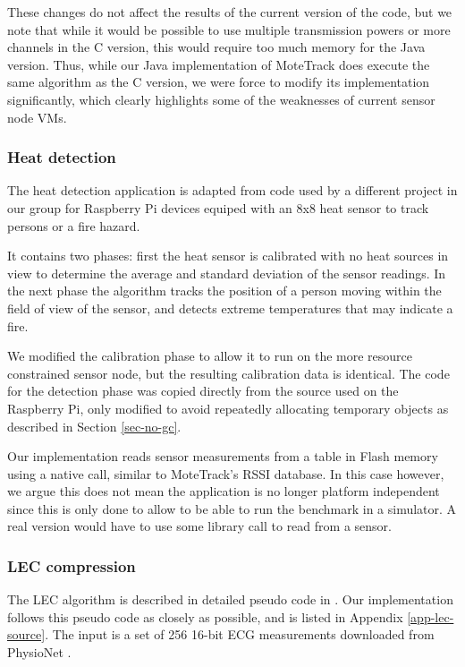 These changes do not affect the results of the current version of the code, but we note that while it would be possible to use multiple transmission powers or more channels in the C version, this would require too much memory for the Java version. Thus, while our Java implementation of MoteTrack does execute the same algorithm as the C version, we were force to modify its implementation significantly, which clearly highlights some of the weaknesses of current sensor node VMs.


\subsubsection{Heat detection}
The heat detection application is adapted from code used by a different project in our group for Raspberry Pi devices equiped with an 8x8 heat sensor to track persons or a fire hazard.

It contains two phases: first the heat sensor is calibrated with no heat sources in view to determine the average and standard deviation of the sensor readings. In the next phase the algorithm tracks the position of a person moving within the field of view of the sensor, and detects extreme temperatures that may indicate a fire.

We modified the calibration phase to allow it to run on the more resource constrained sensor node, but the resulting calibration data is identical. The code for the detection phase was copied directly from the source used on the Raspberry Pi, only modified to avoid repeatedly allocating temporary objects as described in Section \ref{sec-no-gc}.

Our implementation reads sensor measurements from a table in Flash memory using a native call, similar to MoteTrack's RSSI database. In this case however, we argue this does not mean the application is no longer platform independent since this is only done to allow to be able to run the benchmark in a simulator. A real version would have to use some library call to read from a sensor.


\subsubsection{LEC compression}
The LEC algorithm is described in detailed pseudo code in \cite{Marcelloni:2009ja}. Our implementation follows this pseudo code as closely as possible, and is listed in Appendix \ref{app-lec-source}. The input is a set of 256 16-bit ECG measurements downloaded from PhysioNet \cite{physionet-ecg-data}.



